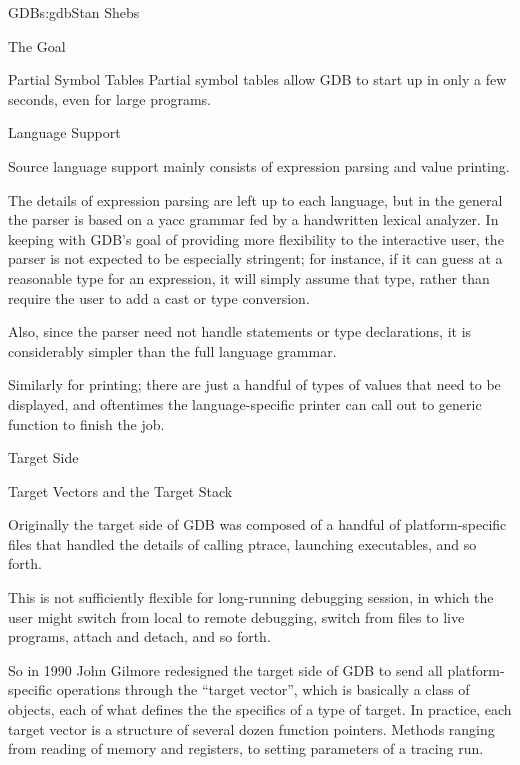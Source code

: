 \begin{aosachapter}{GDB}{s:gdb}{Stan Shebs}
\begin{aosasect1}{The Goal}
\begin{aosasect1}{Partial Symbol Tables}
Partial symbol tables allow GDB to start up in only a few seconds, even
for large programs.

\end{aosasect1}

\begin{aosasect1}{Language Support}

Source language support mainly consists of expression parsing and value
printing.

The details of expression parsing are left up to each language, but in
the general the parser is based on a yacc grammar fed by a handwritten
lexical analyzer.  In keeping with GDB's goal of providing more
flexibility to the interactive user, the parser is not expected to be
especially stringent; for instance, if it can guess at a reasonable
type for an expression, it will simply assume that type, rather than
require the user to add a cast or type conversion.

Also, since the parser need not handle statements or type declarations,
it is considerably simpler than the full language grammar.

Similarly for printing; there are just a handful of types of values that
need to be displayed, and oftentimes the language-specific printer can
call out to generic function to finish the job.

\end{aosasect1}

\begin{aosasect1}{Target Side}

\end{aosasect1}

\begin{aosasect1}{Target Vectors and the Target Stack}

Originally the target side of GDB was composed of a handful of
platform-specific files that handled the details of calling ptrace,
launching executables, and so forth.

This is not sufficiently flexible for long-running debugging session,
in which the user might switch from local to remote debugging, switch
from files to live programs, attach and detach, and so forth.

So in 1990 John Gilmore redesigned the target side of GDB to send all
platform-specific operations through the ``target vector'', which is
basically a class of objects, each of what defines the the specifics
of a type of target.  In practice, each target vector is a structure
of several dozen function pointers.  Methods ranging from reading of
memory and registers, to setting parameters of a tracing run.


\end{aosasect1}
\end{aosasect1}
\end{aosachapter}
